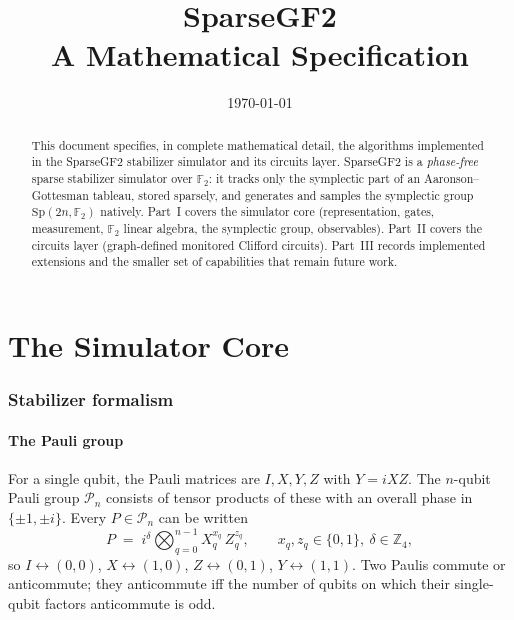 \documentclass[11pt]{article}
\title{\textbf{SparseGF2}\\[2pt]\large A Mathematical Specification}
\author{}
\date{\today}
\theoremstyle{definition}
\theoremstyle{plain}
\newcommand{\F}{\mathbb{F}}
\newcommand{\Z}{\mathbb{Z}}
\newcommand{\Sp}{\mathrm{Sp}}
\newcommand{\code}{\textsf{\small SparseGF2}}
\begin{document}
\maketitle

\begin{abstract}
\noindent
This document specifies, in complete mathematical detail, the algorithms
implemented in the \code{} stabilizer simulator and its circuits layer. \code{}
is a \emph{phase-free} sparse stabilizer simulator over $\F_2$: it tracks only
the symplectic part of an Aaronson--Gottesman tableau, stored sparsely, and
generates and samples the symplectic group $\Sp(2n,\F_2)$ natively. Part~I
covers the simulator core (representation, gates, measurement, $\F_2$ linear
algebra, the symplectic group, observables). Part~II covers the circuits layer
(graph-defined monitored Clifford circuits). Part~III records implemented
extensions and the smaller set of capabilities that remain future work.
\end{abstract}

\tableofcontents

\part{The Simulator Core}

\section{Stabilizer formalism}
\label{sec:stab}

\subsection{The Pauli group}
For a single qubit, the Pauli matrices are $I,X,Y,Z$ with $Y=iXZ$. The
$n$-qubit Pauli group $\mathcal{P}_n$ consists of tensor products of these with
an overall phase in $\{\pm 1,\pm i\}$. Every $P\in\mathcal{P}_n$ can be written
\begin{equation}
\label{eq:pauli-xz}
  P \;=\; i^{\delta}\bigotimes_{q=0}^{n-1} X_q^{x_q}\,Z_q^{z_q},
  \qquad x_q,z_q\in\{0,1\},\ \delta\in\Z_4 ,
\end{equation}
so $I\leftrightarrow(0,0)$, $X\leftrightarrow(1,0)$, $Z\leftrightarrow(0,1)$,
$Y\leftrightarrow(1,1)$. Two Paulis commute or anticommute; they anticommute
iff the number of qubits on which their single-qubit factors anticommute is odd.
\end{document}
